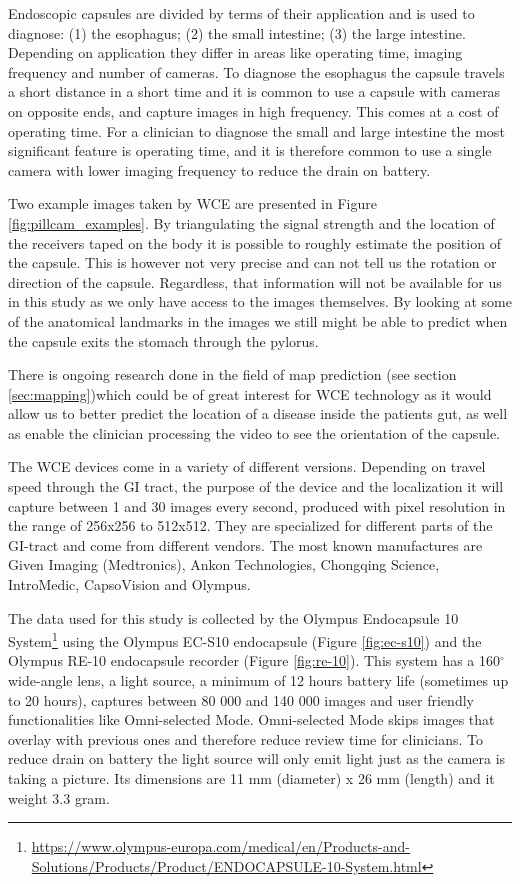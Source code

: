 \documentclass[thesis.tex]{subfiles}
\begin{document}
Endoscopic capsules are divided by terms of their application and is used to diagnose: (1) the esophagus; (2) the small intestine; (3) the large intestine. Depending on application they differ in areas like operating time, imaging frequency and number of cameras. To diagnose the esophagus the capsule travels a short distance in a short time and it is common to use a capsule with cameras on opposite ends, and capture images in high frequency. This comes at a cost of operating time. For a clinician to diagnose the small and large intestine the most significant feature is operating time, and it is therefore common to use a single camera with lower imaging frequency to reduce the drain on battery.

Two example images taken by WCE are presented in Figure \ref{fig:pillcam_examples}. By triangulating the signal strength and the location of the receivers taped on the body it is possible to roughly estimate the position of the capsule. This is however not very precise and can not tell us the rotation or direction of the capsule. Regardless, that information will not be available for us in this study as we only have access to the images themselves. By looking at some of the anatomical landmarks in the images we still might be able to predict when the capsule exits the stomach through the pylorus. %

There is ongoing research done in the field of map prediction (see section \ref{sec:mapping})which could be of great interest for WCE technology as it would allow us to better predict the location of a disease inside the patients gut, as well as enable the clinician processing the video to see the orientation of the capsule.

The WCE devices come in a variety of different versions. Depending on travel speed through the GI tract, the purpose of the device and the localization it will capture between 1 and 30 images every second, produced with pixel resolution in the range of 256x256 to 512x512. They are specialized for different parts of the GI-tract and come from different vendors. The most known manufactures are Given Imaging (Medtronics), Ankon Technologies, Chongqing Science, IntroMedic, CapsoVision and Olympus.

The data used for this study is collected by the Olympus Endocapsule 10 System\footnote{\url{https://www.olympus-europa.com/medical/en/Products-and-Solutions/Products/Product/ENDOCAPSULE-10-System.html}} using the Olympus EC-S10 endocapsule (Figure \ref{fig:ec-s10}) and the Olympus RE-10 endocapsule recorder (Figure \ref{fig:re-10}). This system has a 160$^{\circ}$ wide-angle lens, a light source, a minimum of 12 hours battery life (sometimes up to 20 hours), captures between 80 000 and 140 000 images and user friendly functionalities like Omni-selected Mode. Omni-selected Mode skips images that overlay with previous ones and therefore reduce review time for clinicians. To reduce drain on battery the light source will only emit light just as the camera is taking a picture. Its dimensions are 11 mm (diameter) x 26 mm (length) and it weight 3.3 gram.
\end{document}
